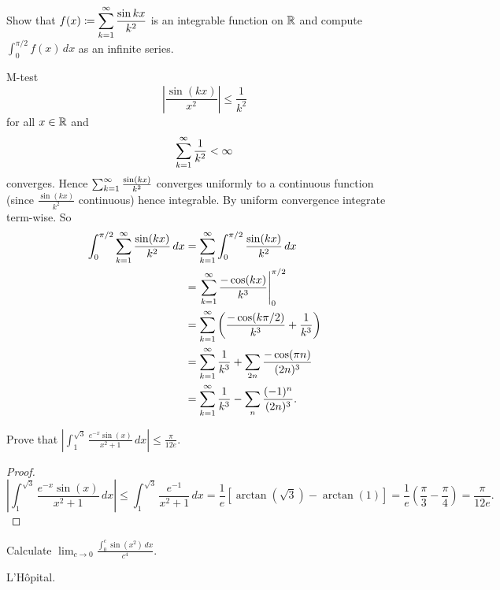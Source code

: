 \documentclass[10pt, a4paper]{article}
\begin{document}
\begin{problem}
    Show that $\displaystyle f(x) \coloneqq \sum_{k = 1}^{\infty}\frac{\sin{kx}}{k ^ 2}$ is an integrable function on $\mathbb{R}$ and compute $\int_{0}^{\pi / 2}f(x)\,dx$ as an infinite series.

    \begin{solution}
        M-test
        \[
        \left|\frac{\sin(kx)}{x ^ 2}\right| \leq \frac{1}{k ^ 2}
        \]
        for all $x \in \mathbb{R}$ and
        \[
        \sum_{k = 1}^{\infty}\frac{1}{k ^ 2} < \infty
        \]
        converges.
        Hence $\sum_{k = 1}^{\infty}\frac{\sin(kx)}{k ^ 2}$ converges uniformly to a continuous function
        (since $\frac{\sin(kx)}{k ^ 2}$ continuous)
        hence integrable.
        By uniform convergence integrate term-wise.
        So
        \begin{align*}
            \int_{0}^{\pi / 2}\sum_{k = 1}^{\infty}\frac{\sin(kx)}{k ^ 2}\,dx &= \sum_{k = 1}^{\infty}\int_{0}^{\pi / 2}\frac{\sin(kx)}{k ^ 2}\,dx \\
            &= \left.\sum_{k = 1}^{\infty}\frac{-\cos(kx)}{k ^ 3}\right|_{0}^{\pi / 2} \\
            &= \sum_{k = 1}^{\infty}\left(\frac{-\cos(k\pi / 2)}{k ^ 3} + \frac{1}{k ^ 3}\right) \\
            &= \sum_{k = 1}^{\infty}\frac{1}{k ^ 3} + \sum_{2n}\frac{-\cos(\pi n)}{(2n) ^ 3} \\
            &= \sum_{k = 1}^{\infty}\frac{1}{k ^ 3} - \sum_{n}\frac{(-1) ^ n}{(2n) ^ 3}.
        \end{align*}
        
    \end{solution}
\end{problem}

\begin{problem}
    Prove that $\displaystyle\left|\int_{1}^{\sqrt{3}}\frac{e ^ {-x}\sin(x)}{x ^ 2 + 1}\,dx\right| \leq \frac{\pi}{12e}$.

    \begin{proof}
        \[
        \left|\int_{1}^{\sqrt{3}}\frac{e ^ {-x}\sin(x)}{x ^ 2 + 1}\,dx\right| \leq \int_{1}^{\sqrt{3}}\frac{e ^ {-1}}{x ^ 2 + 1}\,dx = \frac{1}{e}\left[\arctan(\sqrt{3}) - \arctan(1)\right] = \frac{1}{e}\left(\frac{\pi}{3} - \frac{\pi}{4}\right) = \frac{\pi}{12e}.
        \]
    \end{proof}
\end{problem}

\begin{problem}
    Calculate $\lim_{c \to 0}\frac{\int_{0}^{c}\sin(x ^ 2)\,dx}{c ^ 4}$.

    \begin{solution}
        L'H\^opital.
    \end{solution}
\end{problem}
\end{document}

